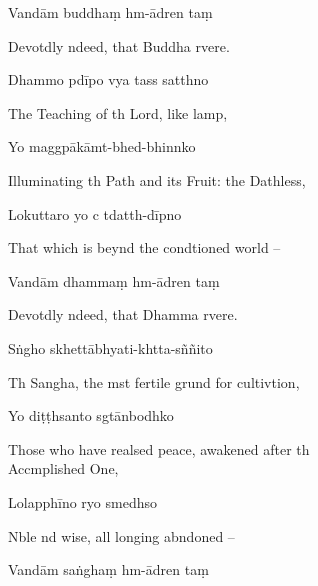Vandām buddhaṃ hm-ādren taṃ

\begin{english}
  Devotdly ndeed, that Buddha  rvere.
\end{english}

Dhammo pdīpo vya tass satthno

\begin{english}
  The Teaching of th Lord, like  lamp,
\end{english}

Yo maggpākāmt-bhed-bhinnko

\begin{english}
  Illuminating th Path and its Fruit: the Dathless,
\end{english}

Lokuttaro yo c tdatth-dīpno

\begin{english}
  That which is beynd the condtioned world --
\end{english}

Vandām dhammaṃ hm-ādren taṃ

\begin{english}
  Devotdly ndeed, that Dhamma  rvere.
\end{english}

Sṅgho skhettābhyati-khtta-sññito

\begin{english}
  Th Sangha, the mst fertile grund for cultivtion,
\end{english}

Yo diṭṭhsanto sgtānbodhko

\begin{english}
  Those who have realsed peace, awakened after th \\Acc{}mplished One,
\end{english}

Lolapphīno ryo smedhso

\begin{english}
  Nble nd wise, all longing abndoned --
\end{english}

Vandām saṅghaṃ hm-ādren taṃ

